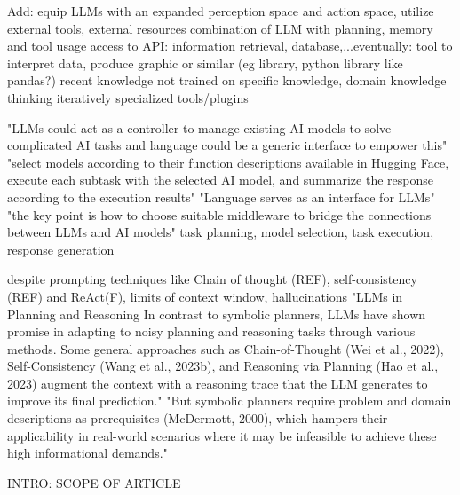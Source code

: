 \documentclass{article}
\begin{document}
Add: equip LLMs with an expanded perception space and action space, utilize external tools, external resources 
combination of LLM with planning, memory and tool usage
access to API: information retrieval, database,...eventually: tool to interpret data, produce graphic or similar (eg library, python library like pandas?)
recent knowledge not trained on
specific knowledge, domain knowledge
thinking iteratively
specialized tools/plugins

\cite{shen_hugginggpt_2023} "LLMs could act as a controller to manage existing AI models to solve complicated AI tasks and language could be a generic interface to empower this" "select models according to their function descriptions available in Hugging Face, execute each subtask with the selected AI model, and summarize the response according to the execution results"
"Language serves as an interface for LLMs"
"the key point is how to choose suitable middleware to bridge the connections between LLMs and AI models"
task planning, model selection, task execution, response generation



\cite{dagan_dynamic_2023} despite prompting techniques like Chain of thought (REF), self-consistency (REF) and ReAct(F), limits of context window, hallucinations
"LLMs in Planning and Reasoning In contrast to symbolic planners, LLMs have shown promise in adapting to noisy planning and reasoning tasks through various methods. Some general approaches such as Chain-of-Thought (Wei et al., 2022), Self-Consistency (Wang et al., 2023b), and Reasoning via Planning (Hao et al., 2023) augment the context with a reasoning trace that the LLM generates to improve its final prediction."
"But symbolic planners require problem and domain descriptions as prerequisites (McDermott, 2000), which hampers their applicability in real-world scenarios where it may be infeasible to achieve these high informational demands."



INTRO: SCOPE OF ARTICLE
\end{document}
